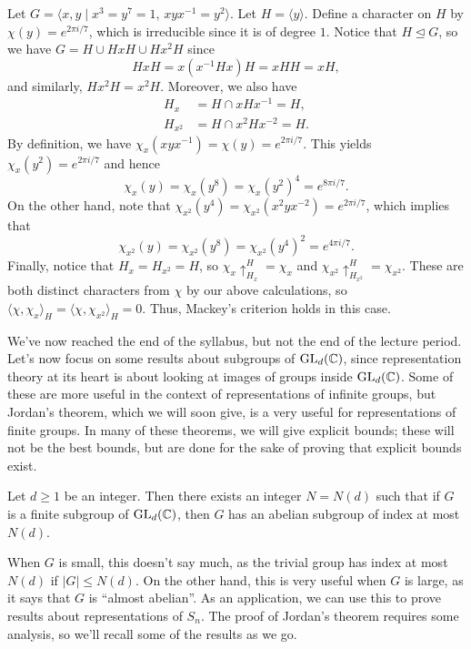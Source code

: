\begin{exmp}{}
    Let $G = \langle x, y \mid x^3 = y^7 = 1,\, xyx^{-1} = y^2 \rangle$. Let 
    $H = \langle y \rangle$. Define a character on $H$ by $\chi(y) = e^{2\pi i/7}$, 
    which is irreducible since it is of degree $1$. Notice that $H \trianglelefteq G$, 
    so we have $G = H \cup HxH \cup Hx^2H$ since 
    \[ HxH = x(x^{-1}Hx)H = xHH = xH, \] 
    and similarly, $Hx^2H = x^2H$. Moreover, we also have 
    \begin{align*}
        H_x &= H \cap xHx^{-1} = H, \\ 
        H_{x^2} &= H \cap x^2Hx^{-2} = H. 
    \end{align*}
    By definition, we have $\chi_x(xyx^{-1}) = \chi(y) = e^{2\pi i/7}$. 
    This yields $\chi_x(y^2) = e^{2\pi i/7}$ and hence 
    \[ \chi_x(y) = \chi_x(y^8) = \chi_x(y^2)^4 = e^{8\pi i/7}. \] 
    On the other hand, note that $\chi_{x^2}(y^4) = \chi_{x^2}(x^2yx^{-2})
    = e^{2\pi i/7}$, which implies that 
    \[ \chi_{x^2}(y) = \chi_{x^2}(y^8) = \chi_{x^2}(y^4)^2 = e^{4\pi i/7}. \] 
    Finally, notice that $H_x = H_{x^2} = H$, so $\chi_x \uparrow_{H_x}^H 
    = \chi_x$ and $\chi_{x^2} \uparrow_{H_{x^2}}^H = \chi_{x^2}$. These 
    are both distinct characters from $\chi$ by our above calculations, 
    so $\langle \chi, \chi_x \rangle_H = \langle \chi, \chi_{x^2} \rangle_H = 0$.
    Thus, Mackey's criterion holds in this case. 
\end{exmp}

We've now reached the end of the syllabus, but not the end of the lecture period. 
Let's now focus on some results about subgroups of $\operatorname{GL}_d(\mathbb{C})$, since 
representation theory at its heart is about looking at images of groups 
inside $\operatorname{GL}_d(\mathbb{C})$. Some of these are more useful in the context of 
representations of infinite groups, but Jordan's theorem, which we will soon 
give, is a very useful for representations of finite groups. In many of these 
theorems, we will give explicit bounds; these will not be the best bounds, 
but are done for the sake of proving that explicit bounds exist. 

\begin{theo}{}
    Let $d \geq 1$ be an integer. Then there exists an integer $N = N(d)$ 
    such that if $G$ is a finite subgroup of $\operatorname{GL}_d(\mathbb{C})$, then $G$ has an 
    abelian subgroup of index at most $N(d)$. 
\end{theo}

When $G$ is small, this doesn't say much, as the trivial group has index 
at most $N(d)$ if $|G| \leq N(d)$. On the other hand, this is very useful 
when $G$ is large, as it says that $G$ is ``almost abelian''. As an 
application, we can use this to prove results about representations of $S_n$. 
The proof of Jordan's theorem requires some analysis, so we'll recall some 
of the results as we go. 

